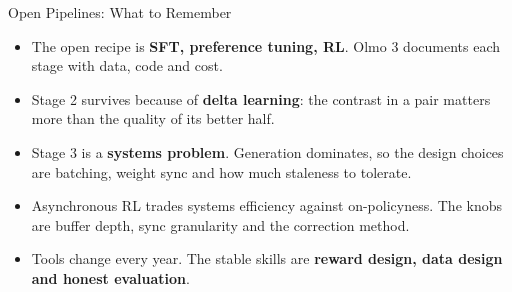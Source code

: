 \begin{frame}{Open Pipelines: What to Remember}
    \begin{itemize}\itemsep0.6em
        \item The open recipe is \textbf{SFT, preference tuning, RL}. Olmo 3 documents each stage with data, code and cost.
        \item Stage 2 survives because of \textbf{delta learning}: the contrast in a pair matters more than the quality of its better half.
        \item Stage 3 is a \textbf{systems problem}. Generation dominates, so the design choices are batching, weight sync and how much staleness to tolerate.
        \item Asynchronous RL trades systems efficiency against on-policyness. The knobs are buffer depth, sync granularity and the correction method.
        \item Tools change every year. The stable skills are \textbf{reward design, data design and honest evaluation}.
    \end{itemize}
    \vspace{0.3em}
\end{frame}
